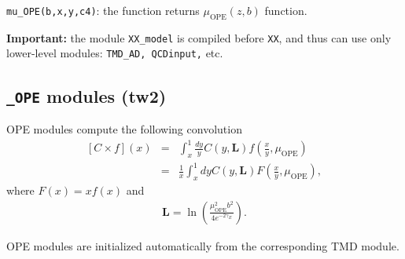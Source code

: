 \documentclass[prd,nofootinbib,eqsecnum,final]{revtex4}
\renewcommand{\(}{\left(}
\renewcommand{\)}{\right)}
\renewcommand{\[}{\left[}
\renewcommand{\]}{\right]}
\begin{document}
\texttt{mu\_OPE(b,x,y,c4)}: the function returns $\mu_\text{OPE}(z,b)$ function.

\textbf{Important:} the module \texttt{XX\_model} is compiled before \texttt{XX}, and thus can use only lower-level modules: \texttt{TMD\_AD, QCDinput,} etc.

\subsection{\texttt{\_OPE} modules (tw2)}
\label{TMD_OPE}

OPE modules compute the following convolution
\begin{eqnarray}\label{OPE:tw2:main}
[C\times f](x)&=&\int_x^1 \frac{dy}{y} C(y,\mathbf{L})f\(\frac{x}{y},\mu_{\text{OPE}}\)
\\
&=&
\frac{1}{x}\int_x^1 dy C(y,\mathbf{L})F\(\frac{x}{y},\mu_{\text{OPE}}\),
\end{eqnarray}
where $F(x)=xf(x)$ and 
\begin{eqnarray}
\mathbf{L}=\ln\(\frac{\mu^2_{\text{OPE}}b^2}{4e^{-2\gamma_E}}\).
\end{eqnarray}

\begin{tcolorbox}
\begin{center}
OPE modules are initialized automatically from the corresponding TMD module.
\end{center}
\end{tcolorbox}
\end{document}
